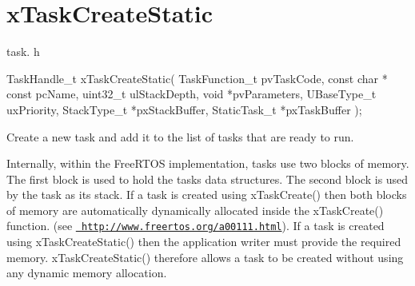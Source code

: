 \hypertarget{group__x_task_create_static}{}\section{x\+Task\+Create\+Static}
\label{group__x_task_create_static}
task. h 
\begin{DoxyPre}
TaskHandle\_t xTaskCreateStatic( TaskFunction\_t pvTaskCode,
                             const char * const pcName,
                             uint32\_t ulStackDepth,
                             void *pvParameters,
                             UBaseType\_t uxPriority,
                             StackType\_t *pxStackBuffer,
                             StaticTask\_t *pxTaskBuffer );\end{DoxyPre}


Create a new task and add it to the list of tasks that are ready to run.

Internally, within the Free\+R\+T\+OS implementation, tasks use two blocks of memory. The first block is used to hold the task\textquotesingle{}s data structures. The second block is used by the task as its stack. If a task is created using x\+Task\+Create() then both blocks of memory are automatically dynamically allocated inside the x\+Task\+Create() function. (see \href{http://www.freertos.org/a00111.html}{\texttt{ http\+://www.\+freertos.\+org/a00111.\+html}}). If a task is created using x\+Task\+Create\+Static() then the application writer must provide the required memory. x\+Task\+Create\+Static() therefore allows a task to be created without using any dynamic memory allocation.


